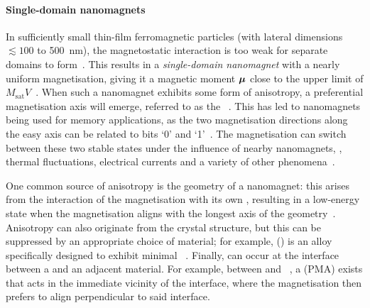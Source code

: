 \paragraph{Single-domain nanomagnets}
In sufficiently small thin-film ferromagnetic particles (with lateral dimensions $\lesssim 100$ to \SI{500}{\nano\metre}), the magnetostatic interaction is too weak for separate domains to form~\cite{Kittel_TheoryFMDomains,BrownThermalFluctuations}.
This results in a \emph{single-domain nanomagnet} with a nearly uniform magnetisation, giving it a magnetic moment $\boldsymbol{\mathbf{\mu}}$ close to the upper limit of $M_\mathrm{sat}V$~\cite{FRENKEL1930,neel1949theorie}. %
When such a nanomagnet exhibits some form of anisotropy, a preferential magnetisation axis will emerge, referred to as the ~\cite{nisoli2013colloquium}.
This has led to nanomagnets being used for memory applications, as the two magnetisation directions along the easy axis can be related to bits `0' and `1'~\cite{MQCA_RoomTemp,NML_Carlton,Gypens_Balanced,Gypens_SelfOrganizing,JM_Masterproef}.
The magnetisation can switch between these two stable states under the influence of nearby nanomagnets, , thermal fluctuations, electrical currents and a variety of other phenomena~\cite{SwitchingForced_EnergyEfficient,BrownThermalFluctuations,neel1949theorie}. \par
One common source of anisotropy is the geometry of a nanomagnet: this  arises from the interaction of the magnetisation with its own , resulting in a low-energy state when the magnetisation aligns with the longest axis of the geometry~\cite{MagneticCharge}.
Anisotropy can also originate from the crystal structure, but this can be suppressed by an appropriate choice of material; for example,  () is an alloy specifically designed to exhibit minimal ~\cite{PyAnisotropyRevisited,PyAnisotropyQuantum}.
Finally,  can occur at the interface between a  and an adjacent material.
For example, between  and ~\cite{PMA_PdCo_PtCo}, a  (PMA) exists that acts in the immediate vicinity of the interface, where the magnetisation then prefers to align perpendicular to said interface.

